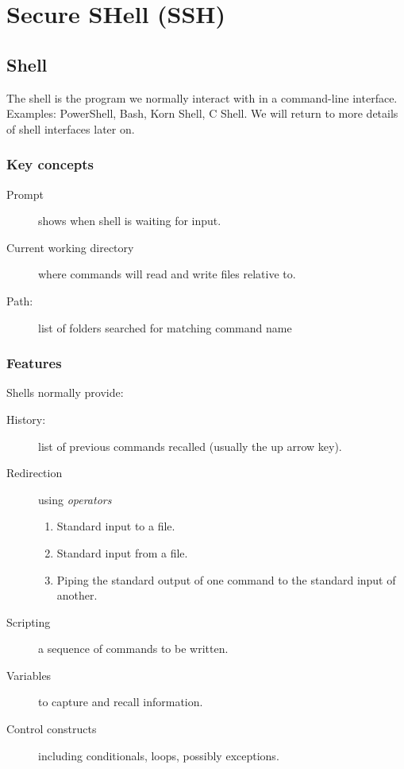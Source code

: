 \chapter{Secure SHell (SSH)}


\section{Shell}

The shell is the program we normally interact with in a command-line interface.
Examples: PowerShell, Bash, Korn Shell, C Shell.
We will return to more details of shell interfaces later on. 

\subsection{Key concepts}

\begin{description}
\item[Prompt] shows when shell is waiting for input.
\item[Current working directory] where commands will read and write files relative to.
\item[Path:] list of folders searched for matching command name
\end{description}

\subsection{Features}

Shells normally provide:

\begin{description}
\item[History:] list of previous commands recalled (usually the up arrow key).
\item[Redirection] using \textit{operators}
  \begin{enumerate}
  \item Standard input to a file.  
  \item Standard input from a file.
  \item Piping the standard output of one command to the standard input of another.
  \end{enumerate}
\item[Scripting] a sequence of commands to be written.
\item[Variables] to capture and recall information.
\item[Control constructs] including conditionals, loops, possibly exceptions.
\end{description}

